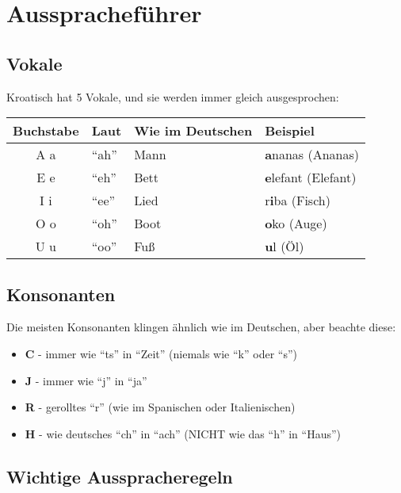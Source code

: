 \section{Ausspracheführer}

\begin{grammar}
\subsection*{Vokale}

Kroatisch hat 5 Vokale, und sie werden immer gleich ausgesprochen:

\begin{center}
\begin{tabular}{clll}
\toprule
Buchstabe & Laut & Wie im Deutschen & Beispiel \\
\midrule
A a & ``ah'' & Mann & \textbf{a}nanas (Ananas) \\
E e & ``eh'' & Bett & \textbf{e}lefant (Elefant) \\
I i & ``ee'' & Lied & r\textbf{i}ba (Fisch) \\
O o & ``oh'' & Boot & \textbf{o}ko (Auge) \\
U u & ``oo'' & Fuß & \textbf{u}l (Öl) \\
\bottomrule
\end{tabular}
\end{center}

\subsection*{Konsonanten}

Die meisten Konsonanten klingen ähnlich wie im Deutschen, aber beachte diese:

\begin{itemize}
    \item \textbf{C} - immer wie ``ts'' in ``Zeit'' (niemals wie ``k'' oder ``s'')
    \item \textbf{J} - immer wie ``j'' in ``ja''
    \item \textbf{R} - gerolltes ``r'' (wie im Spanischen oder Italienischen)
    \item \textbf{H} - wie deutsches ``ch'' in ``ach'' (NICHT wie das ``h'' in ``Haus'')
\end{itemize}

\subsection*{Wichtige Ausspracheregeln}


\end{grammar}
